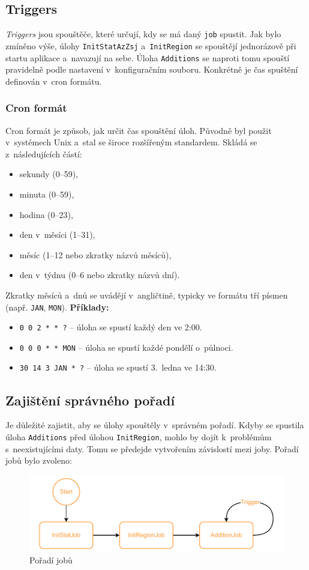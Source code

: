 \subsection{Triggers}
\textit{Triggers} jsou spouštěče, které určují, kdy se má daný \texttt{job} spustit.  
Jak bylo zmíněno výše, úlohy \texttt{InitStatAzZsj} a~\texttt{InitRegion} se spouštějí jednorázově při startu aplikace a~navazují na sebe.  
Úloha \texttt{Additions} se naproti tomu spouští pravidelně podle nastavení v~konfiguračním souboru.  
Konkrétně je čas spuštění definován v~cron formátu.

\subsubsection*{Cron formát}
Cron formát je způsob, jak určit čas spouštění úloh.  
Původně byl použit v~systémech Unix a~stal se široce rozšířeným standardem.  
Skládá se z~následujících částí:
\begin{itemize}
    \item sekundy (0--59),
    \item minuta (0--59),
    \item hodina (0--23),
    \item den v~měsíci (1--31),
    \item měsíc (1--12 nebo zkratky názvů měsíců),
    \item den v~týdnu (0--6 nebo zkratky názvů dní).
\end{itemize}
Zkratky měsíců a~dnů se uvádějí v~angličtině, typicky ve formátu tří písmen (např. \texttt{JAN}, \texttt{MON}).
\textbf{Příklady:}
\begin{itemize}
    \item \texttt{0 0 2 * * ?} -- úloha se spustí každý den ve 2:00.
    \item \texttt{0 0 0 * * MON} -- úloha se spustí každé pondělí o~půlnoci.
    \item \texttt{30 14 3 JAN * ?} -- úloha se spustí 3.~ledna ve 14:30.
\end{itemize}

\subsection{Zajištění správného pořadí}
Je důležité zajistit, aby se úlohy spouštěly v~správném pořadí.
Kdyby se spustila úloha \texttt{Additions} před úlohou \texttt{InitRegion}, 
mohlo by dojít k~problémům s~neexistujícími daty.
Tomu se předejde vytvořením závislostí mezi joby.
Pořadí jobů bylo zvoleno:
\begin{figure}[!h]
    \label{fig:jobs_scheduled}
    \caption{Pořadí jobů}
    \centering
    \includegraphics[width=\textwidth]{figures/jobs_scheduled.pdf}
\end{figure}

